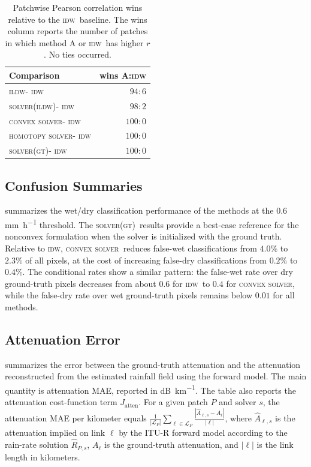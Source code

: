 \documentclass[a4paper,fleqn]{cas-sc}
\DeclareRobustCommand{\IDW}{\textsc{idw}}
\DeclareRobustCommand{\ILDW}{\textsc{ildw}}
\DeclareRobustCommand{\solverILDW}{\textsc{solver(ildw)}}
\DeclareRobustCommand{\solverGT}{\textsc{solver(gt)}}
\DeclareRobustCommand{\solverConvex}{\textsc{convex solver}}
\DeclareRobustCommand{\solverHomotopy}{\textsc{homotopy solver}}
\DeclareRobustCommand{\ConvexSolver}{\solverConvex}
\DeclareRobustCommand{\Homotopy}{\solverHomotopy}
\begin{document}
\begin{table}[!htbp]
  \centering
  \begin{tabular}{lr}
    \toprule
    Comparison           & wins A:\IDW \\
    \midrule
    \ILDW - \IDW         & $94:6$      \\
    \solverILDW - \IDW   & $98:2$      \\
    \ConvexSolver - \IDW & $100:0$     \\
    \Homotopy - \IDW     & $100:0$     \\
    \solverGT - \IDW     & $100:0$     \\
    \bottomrule
  \end{tabular}
  \caption{Patchwise Pearson correlation wins relative to the \IDW\ baseline. The wins column reports the number of patches in which method A or \IDW\ has higher $r$. No ties occurred.}
  \label{tab:paired-pearson-sign-test}
\end{table}


\subsection{Confusion Summaries}
 summarizes the wet/dry classification performance of the methods at the $0.6$ \si{\milli\meter\per\hour} threshold. The \solverGT\ results provide a best-case reference for the nonconvex formulation when the solver is initialized with the ground truth. Relative to \IDW, \ConvexSolver\ reduces false-wet classifications from $4.0\%$ to $2.3\%$ of all pixels, at the cost of increasing false-dry classifications from $0.2\%$ to $0.4\%$.
The conditional rates show a similar pattern: the false-wet rate over dry ground-truth pixels decreases from about $0.6$ for \IDW\ to $0.4$ for \ConvexSolver, while the false-dry rate over wet ground-truth pixels remains below $0.01$ for all methods.



\subsection{Attenuation Error}
 summarizes the error between the ground-truth attenuation and the attenuation reconstructed from the estimated rainfall field using the forward model. The main quantity is attenuation MAE, reported in \si{\deci\bel\per\kilo\meter}. The table also reports the attenuation cost-function term $J_{\mathrm{atten}}$.
For a given patch $P$ and solver $s$, the attenuation MAE per kilometer equals $\frac{1}{|\mathcal{L}_P|}\sum_{\ell \in \mathcal{L}_P} \frac{\left|\hat{A}_{\ell,s} - A_\ell\right|}{|\ell|}$, where $\hat{A}_{\ell,s}$ is the attenuation implied on link $\ell$ by the ITU-R forward model according to the rain-rate solution $\hat{R}_{P,s}$, $A_\ell$ is the ground-truth attenuation, and $|\ell|$ is the link length in kilometers.
\end{document}
